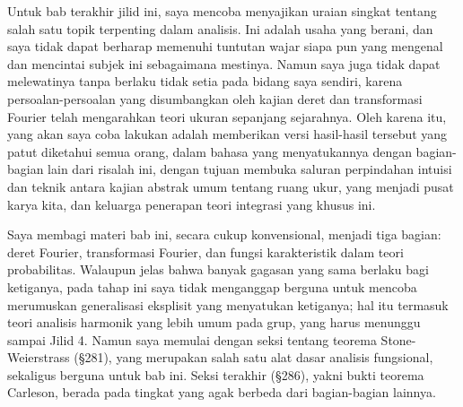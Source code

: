  
\def\chaptername{Analisis Fourier} 
\def\sectionname{Pendahuluan} 
 
 
Untuk bab terakhir jilid ini, saya mencoba menyajikan uraian singkat tentang salah satu topik terpenting dalam analisis. Ini adalah usaha yang berani, dan saya tidak dapat berharap memenuhi tuntutan wajar siapa pun yang mengenal dan mencintai subjek ini sebagaimana mestinya. Namun saya juga tidak dapat melewatinya tanpa berlaku tidak setia pada bidang saya sendiri, karena persoalan-persoalan yang disumbangkan oleh kajian deret dan transformasi Fourier telah mengarahkan teori ukuran sepanjang sejarahnya. Oleh karena itu, yang akan saya coba lakukan adalah memberikan versi hasil-hasil tersebut yang patut diketahui semua orang, dalam bahasa yang menyatukannya dengan bagian-bagian lain dari risalah ini, dengan tujuan membuka saluran perpindahan intuisi dan teknik antara kajian abstrak umum tentang ruang ukur, yang menjadi pusat karya kita, dan keluarga penerapan teori integrasi yang khusus ini. 
 
Saya membagi materi bab ini, secara cukup konvensional, menjadi tiga bagian: deret Fourier, transformasi Fourier, dan fungsi karakteristik dalam teori probabilitas. Walaupun jelas bahwa banyak gagasan yang sama berlaku bagi ketiganya, pada tahap ini saya tidak menganggap berguna untuk mencoba merumuskan generalisasi eksplisit yang menyatukan ketiganya; hal itu termasuk teori analisis harmonik yang lebih umum pada grup, yang harus menunggu sampai Jilid 4. Namun saya memulai dengan seksi tentang teorema Stone-Weierstrass (\S281), yang merupakan salah satu alat dasar analisis fungsional, sekaligus berguna untuk bab ini. Seksi terakhir (\S286), yakni bukti teorema Carleson, berada pada tingkat yang agak berbeda dari bagian-bagian lainnya. 
 
\discrpage 
 
